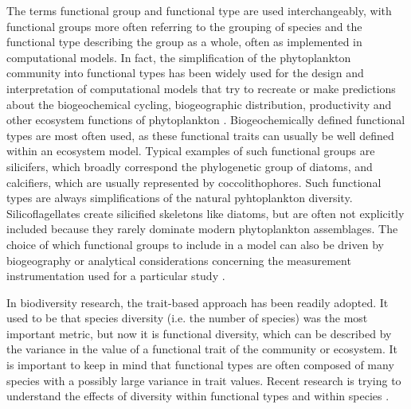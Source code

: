 The terms functional group and functional type are used interchangeably, with functional groups more often referring to the grouping of species and the functional type describing the group as a whole, often as implemented in computational models. In fact, the simplification of the phytoplankton community into functional types has been widely used for the design and interpretation of computational models that try to recreate or make predictions about the biogeochemical cycling, biogeographic distribution, productivity and other ecosystem functions of phytoplankton \citep{Gregg2003,LeQuere2005}. Biogeochemically defined functional types are most often used, as these functional traits can usually be well defined within an ecosystem model. Typical examples of such functional groups are silicifers, which broadly correspond the phylogenetic group of diatoms, and calcifiers, which are usually represented by coccolithophores. Such functional types are always simplifications of the natural pyhtoplankton diversity. Silicoflagellates create silicified skeletons like diatoms, but are often not explicitly included because they rarely dominate modern phytoplankton assemblages. The choice of which functional groups to include in a model can also be driven by biogeography or analytical considerations concerning the measurement instrumentation used for a particular study \citep{IrwinAndrewJ.Finkel2017b}. 

In biodiversity research, the trait-based approach has been readily adopted. It used to be that species diversity (i.e. the number of species) was the most important metric, but now it is functional diversity, which can be described by the variance in the value of a functional trait of the community or ecosystem. It is important to keep in mind that functional types are often composed of many species with a possibly large variance in trait values. Recent research is trying to understand the effects of diversity within functional types and within species \citep{Violle2012,Violle2017a,DesRoches2018}.




